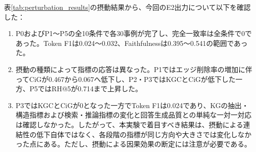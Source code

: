 \documentclass[a4j,dvipdfmx]{jsarticle}
\begin{document}
表\ref{tab:perturbation_results}の摂動結果から、今回のE2出力について以下を確認した：
\begin{enumerate}
    \item P0およびP1〜P5の全10条件で各30事例が完了し、完全一致率は全条件で0であった。Token F1は0.024〜0.032、Faithfulnessは0.395〜0.541の範囲であった。
    \item 摂動の種類によって指標の応答は異なった。P1ではエッジ削除率の増加に伴ってCiGが0.467から0.067へ低下し、P2・P3ではKGCとCiGが低下した一方、P5ではRH@5が0.714まで上昇した。
    \item P3ではKGCとCiGが0となった一方でToken F1は0.024であり、KGの抽出・構造指標および検索・推論指標の変化と回答生成品質との単純な一対一対応は確認しなかった。したがって、本実験で着目すべき結果は、摂動による連結性の低下自体ではなく、各段階の指標が同じ方向や大きさでは変化しなかった点にある。ただし、摂動による因果効果の断定には注意が必要である。
\end{enumerate}
\end{document}
